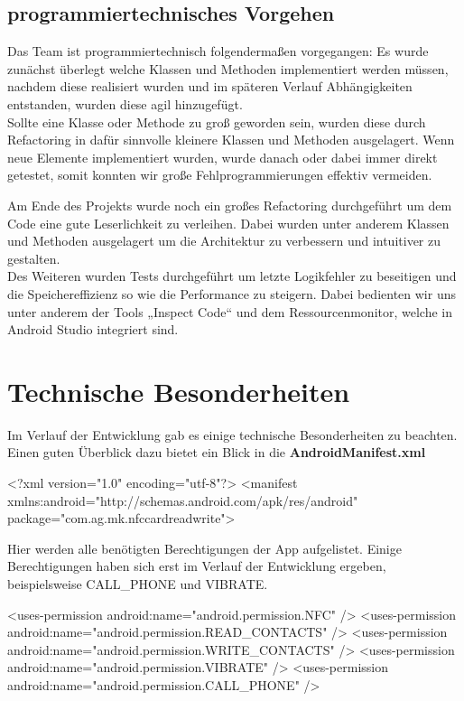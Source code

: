 \documentclass[a4paper,ngerman,12pt]{scrreprt}
\newcommand{\+}{\discretionary{\mbox{\scriptsize$\hookleftarrow$}}{}{}}
\begin{document}
\subsection{programmiertechnisches Vorgehen}

Das Team ist programmiertechnisch folgendermaßen vorgegangen\+: Es wurde zunächst überlegt welche Klassen und Methoden implementiert werden müssen, nachdem diese realisiert wurden und im späteren Verlauf Abhängigkeiten entstanden, wurden diese agil hinzugefügt. \\
Sollte eine Klasse oder Methode zu groß geworden sein, wurden diese durch \ac{Refactoring} in dafür sinnvolle kleinere Klassen und Methoden ausgelagert. Wenn neue Elemente implementiert wurden, wurde danach oder dabei immer direkt getestet, somit konnten wir große Fehlprogrammierungen effektiv vermeiden.

Am Ende des Projekts wurde noch ein großes Refactoring durchgeführt um dem Code eine gute Leserlichkeit zu verleihen. Dabei wurden unter anderem Klassen und Methoden ausgelagert um die Architektur zu verbessern und intuitiver zu gestalten. \\
Des Weiteren wurden Tests durchgeführt um letzte Logikfehler zu beseitigen und die Speichereffizienz so wie die Performance zu steigern. Dabei bedienten wir uns unter anderem der Tools „\+Inspect Code“ und dem Ressourcenmonitor, welche in Android Studio integriert sind.

\section{Technische Besonderheiten}

Im Verlauf der Entwicklung gab es einige technische Besonderheiten zu beachten. Einen guten Überblick dazu bietet ein Blick in die {\bfseries Android\+Manifest.\+xml} \begin{DoxyVerb}<?xml version="1.0" encoding="utf-8"?>
<manifest xmlns:android="http://schemas.android.com/apk/res/android"
    package="com.ag.mk.nfccardreadwrite">
\end{DoxyVerb}


Hier werden alle benötigten Berechtigungen der App aufgelistet. Einige Berechtigungen haben sich erst im Verlauf der Entwicklung ergeben, beispielsweise C\+A\+L\+L\+\_\+\+P\+H\+O\+NE und V\+I\+B\+R\+A\+TE. \begin{DoxyVerb}    <uses-permission android:name="android.permission.NFC" />
    <uses-permission android:name="android.permission.READ_CONTACTS" />
    <uses-permission android:name="android.permission.WRITE_CONTACTS" />
    <uses-permission android:name="android.permission.VIBRATE" />
    <uses-permission android:name="android.permission.CALL_PHONE" />
\end{DoxyVerb}
\end{document}
